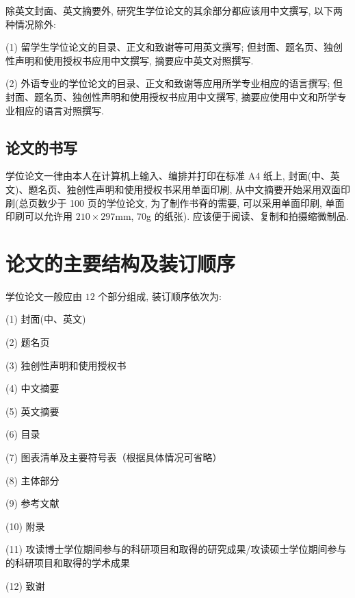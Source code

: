 除英文封面、英文摘要外, 研究生学位论文的其余部分都应该用中文撰写, 以下两种情况除外:

(1) 留学生学位论文的目录、正文和致谢等可用英文撰写; 但封面、题名页、独创性声明和使用授权书应用中文撰写, 摘要应中英文对照撰写.

(2) 外语专业的学位论文的目录、正文和致谢等应用所学专业相应的语言撰写; 但封面、题名页、独创性声明和使用授权书应用中文撰写, 
摘要应使用中文和所学专业相应的语言对照撰写. 

\subsection{论文的书写}

学位论文一律由本人在计算机上输入、编排并打印在标准 A4 纸上, 封面(中、英文)、题名页、独创性声明和使用授权书采用单面印刷,
从中文摘要开始采用双面印刷(总页数少于 100 页的学位论文, 为了制作书脊的需要, 可以采用单面印刷, 单面印刷可以允许用 
$210\times 297$mm, 70g 的纸张). 应该便于阅读、复制和拍摄缩微制品.


\section{论文的主要结构及装订顺序}

学位论文一般应由 $12$ 个部分组成, 装订顺序依次为:

(1) 封面(中、英文)	

(2) 题名页	

(3) 独创性声明和使用授权书	

(4) 中文摘要	

(5) 英文摘要	

(6) 目录

(7) 图表清单及主要符号表（根据具体情况可省略）	

(8) 主体部分

(9) 参考文献

(10) 附录

(11) 攻读博士学位期间参与的科研项目和取得的研究成果/攻读硕士学位期间参与的科研项目和取得的学术成果

(12) 致谢